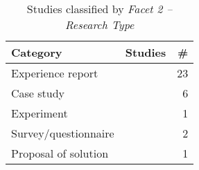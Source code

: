 
\begin{table}[bt]
	\centering
	\caption{Studies classified by \it Facet 2 – Research Type}
		{\begin{tabular}{l|p{1.6in}|r}
			\bf Category & \bf Studies & \bf \# \\
			\hline
			Experience report & \citep{id17882, id0135, id5343, id5353, id17796, id5357, id1088, id4503, id4663, id4811, id17805, id17830,id17845,id18433, id5329, id5335, id0089, id0115, id17800, id0106, id4966, id18359, id5328} & 23 \\
			Case study & \citep{id0093, id4815, id5546, id0134, id1192, id1193} & 6 \\
			Experiment &  \citep{id5676} & 1 \\
			Survey/questionnaire & \citep{id0098, id5147} & 2 \\
			Proposal of solution & \citep{id1097} & 1 \\	
		\end{tabular}} \label{tab:researchTypeStudies}
\end{table}
